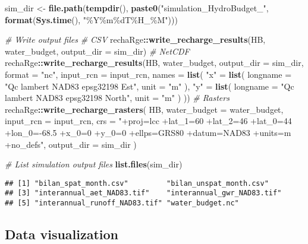 \documentclass[
]{book}
\newenvironment{Shaded}{\begin{snugshade}}{\end{snugshade}}
\newcommand{\AttributeTok}[1]{\textcolor[rgb]{0.13,0.29,0.53}{#1}}
\newcommand{\CommentTok}[1]{\textcolor[rgb]{0.56,0.35,0.01}{\textit{#1}}}
\newcommand{\FunctionTok}[1]{\textcolor[rgb]{0.13,0.29,0.53}{\textbf{#1}}}
\newcommand{\NormalTok}[1]{#1}
\newcommand{\OtherTok}[1]{\textcolor[rgb]{0.56,0.35,0.01}{#1}}
\newcommand{\SpecialCharTok}[1]{\textcolor[rgb]{0.81,0.36,0.00}{\textbf{#1}}}
\newcommand{\StringTok}[1]{\textcolor[rgb]{0.31,0.60,0.02}{#1}}
\begin{document}
\begin{Shaded}
\begin{Highlighting}[]
\NormalTok{sim\_dir }\OtherTok{\textless{}{-}} \FunctionTok{file.path}\NormalTok{(}\FunctionTok{tempdir}\NormalTok{(), }\FunctionTok{paste0}\NormalTok{(}\StringTok{"simulation\_HydroBudget\_"}\NormalTok{, }\FunctionTok{format}\NormalTok{(}\FunctionTok{Sys.time}\NormalTok{(), }\StringTok{"\%Y\%m\%dT\%H\_\%M"}\NormalTok{)))}

\CommentTok{\# Write output files}
\CommentTok{\# CSV}
\NormalTok{rechaRge}\SpecialCharTok{::}\FunctionTok{write\_recharge\_results}\NormalTok{(HB, water\_budget, }\AttributeTok{output\_dir =}\NormalTok{ sim\_dir)}
\CommentTok{\# NetCDF}
\NormalTok{rechaRge}\SpecialCharTok{::}\FunctionTok{write\_recharge\_results}\NormalTok{(HB, water\_budget, }\AttributeTok{output\_dir =}\NormalTok{ sim\_dir, }\AttributeTok{format =} \StringTok{"nc"}\NormalTok{, }\AttributeTok{input\_rcn =}\NormalTok{ input\_rcn, }\AttributeTok{names =} \FunctionTok{list}\NormalTok{(}
  \StringTok{"x"} \OtherTok{=} \FunctionTok{list}\NormalTok{(}
    \AttributeTok{longname =} \StringTok{"Qc lambert NAD83 epsg32198 Est"}\NormalTok{,}
    \AttributeTok{unit =} \StringTok{"m"}
\NormalTok{  ),}
  \StringTok{"y"} \OtherTok{=} \FunctionTok{list}\NormalTok{(}
    \AttributeTok{longname =} \StringTok{"Qc lambert NAD83 epsg32198 North"}\NormalTok{,}
    \AttributeTok{unit =} \StringTok{"m"}
\NormalTok{  )}
\NormalTok{))}
\CommentTok{\# Rasters}
\NormalTok{rechaRge}\SpecialCharTok{::}\FunctionTok{write\_recharge\_rasters}\NormalTok{(}
\NormalTok{  HB,}
  \AttributeTok{water\_budget =}\NormalTok{ water\_budget,}
  \AttributeTok{input\_rcn =}\NormalTok{ input\_rcn,}
  \AttributeTok{crs =} \StringTok{"+proj=lcc +lat\_1=60 +lat\_2=46 +lat\_0=44 +lon\_0={-}68.5 +x\_0=0 +y\_0=0 +ellps=GRS80 +datum=NAD83 +units=m +no\_defs"}\NormalTok{,}
  \AttributeTok{output\_dir =}\NormalTok{ sim\_dir}
\NormalTok{)}


\CommentTok{\# List simulation output files}
\FunctionTok{list.files}\NormalTok{(sim\_dir)}
\end{Highlighting}
\end{Shaded}

\begin{verbatim}
## [1] "bilan_spat_month.csv"         "bilan_unspat_month.csv"      
## [3] "interannual_aet_NAD83.tif"    "interannual_gwr_NAD83.tif"   
## [5] "interannual_runoff_NAD83.tif" "water_budget.nc"
\end{verbatim}

\hypertarget{data-visualization}{%
\subsection{Data visualization}\label{data-visualization}}
\end{document}

